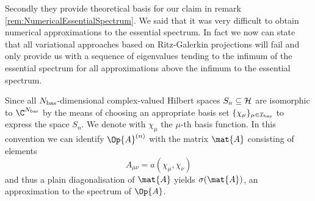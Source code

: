 Secondly they provide theoretical basis
for our claim in remark \vref{rem:NumericalEssentialSpectrum}.
We said that it was very difficult to obtain
numerical approximations to the essential spectrum.
In fact we now can state that all variational
approaches based on Ritz-Galerkin projections
will fail and only provide us with a sequence of eigenvalues
tending to the infimum of the essential spectrum
for all approximations above the infimum to the essential spectrum.



Since all $N_\text{bas}$-dimensional complex-valued Hilbert spaces $S_n \subseteq \mathcal{H}$
are isomorphic to $\C^{\Nbas}$ by the means of choosing an appropriate
basis set $\{\chi_\mu\}_{\mu \in \mathcal{I}_\text{bas}}$ to express the space $S_n$.
We denote with $\chi_\mu$ the $\mu$-th basis function.
In this convention we can identify $\Op{A}^{(n)}$ with the matrix $\mat{A}$
consisting of elements
\[ A_{\mu\nu} = a(\chi_\mu, \chi_\nu) \]
and thus a plain diagonalisation of $\mat{A}$ yields $\sigma(\mat{A})$,
an approximation to the spectrum of $\Op{A}$.

